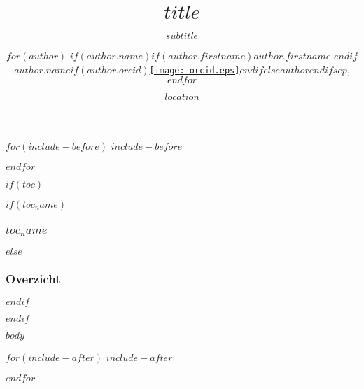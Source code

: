 \documentclass[
  $if(handout)$handout, beameroptions={$endif$ hyperref={colorlinks=true,citecolor=link.colour,linkcolor=link.colour,urlcolor=link.colour},
  $if(fontsize)$$fontsize$$else$10pt$endif$,
  xetex,
  noamsthm$if(aspect)$, aspectratio=$aspect$ $endif$$if(handout)$}$endif$
]{beamer$if(handout)$switch$endif$}
\title{$title$}
\subtitle{$subtitle$}
\author{
$for(author)$
$if(author.name)$$if(author.firstname)$$author.firstname$ $endif$$author.name$$if(author.orcid)$\href{https://orcid.org/$author.orcid$}{\texttt{[image: orcid.eps]}}$endif$$else$$author$$endif$$sep$, $endfor$
}
\institute{$institute$}
\date{$location$}
\date{}
\begin{document}
\begin{frame}[plain, label=intro, noframenumbering]
  \titlepage
\end{frame}

$for(include-before)$
$include-before$

$endfor$

$if(toc)$
\begin{frame}
$if(toc_name)$
  \frametitle{$toc_name$}
$else$
  \frametitle{Overzicht}
$endif$
	\tableofcontents
\end{frame}
$endif$

$body$

$for(include-after)$
$include-after$

$endfor$
\end{document}
